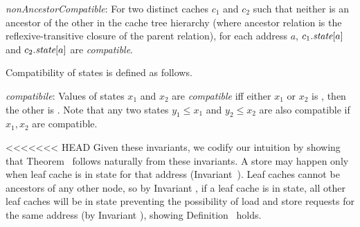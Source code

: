 \begin{inv}
\textit{nonAncestorCompatible}: For two distinct caches $c_1$ and $c_2$ such
that neither is an ancestor of the other in the cache tree
hierarchy (where ancestor relation is the reflexive-transitive closure of the parent relation), for each
address $a$, $c_1.\textit{state}[a]$ and $c_2.\textit{state}[a]$ are \textit{compatible}.
\label{nonAncestorCompatible}
\end{inv}
Compatibility of states is defined as follows.
\begin{defn}
\textit{compatibile}: Values of states $x_1$ and $x_2$ are \textit{compatible} iff
either $x_1$ or $x_2$ is \Mo{}, then the other is \In. Note that any two states $y_1 \le x_1$ and $y_2 \le x_2$ are also compatible if $x_1, x_2$ are compatible.
\label{compatible}
\end{defn}

%

<<<<<<< HEAD
Given these invariants, we codify our intuition by showing that
Theorem~ follows naturally from these
invariants.  A store may happen only when leaf cache is in \Mo{} state
for that address (Invariant~). Leaf caches cannot
be ancestors of any other node, so by Invariant
, if a leaf cache is in \Mo{} state, all
other leaf caches will be in \In{} state preventing the possibility of
load and store requests for the same address (by Invariant
), showing Definition~ holds.

